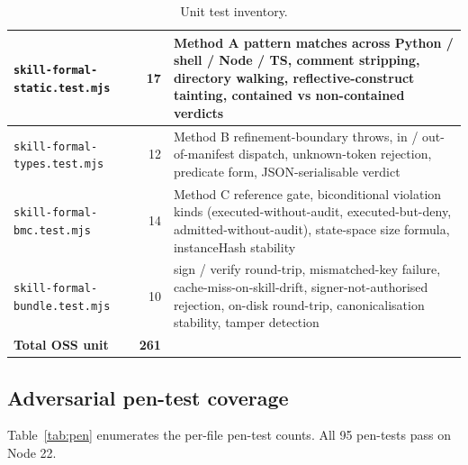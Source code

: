 \documentclass[11pt]{article}
\begin{document}
\begin{table}[t]
\begin{tabular}{|l|r|p{6cm}|}
    \hline
    \texttt{skill-formal-static.test.mjs} & 17 & Method A pattern matches across Python / shell / Node / TS, comment stripping, directory walking, reflective-construct tainting, contained vs non-contained verdicts \\
    \hline
    \texttt{skill-formal-types.test.mjs} & 12 & Method B refinement-boundary throws, in / out-of-manifest dispatch, unknown-token rejection, predicate form, JSON-serialisable verdict \\
    \hline
    \texttt{skill-formal-bmc.test.mjs} & 14 & Method C reference gate, biconditional violation kinds (executed-without-audit, executed-but-deny, admitted-without-audit), state-space size formula, instanceHash stability \\
    \hline
    \texttt{skill-formal-bundle.test.mjs} & 10 & sign / verify round-trip, mismatched-key failure, cache-miss-on-skill-drift, signer-not-authorised rejection, on-disk round-trip, canonicalisation stability, tamper detection \\
    \hline
    \textbf{Total OSS unit} & \textbf{261} & \\
    \hline
  \end{tabular}
  \caption{Unit test inventory.}
  \label{tab:unit}
\end{table}

\subsection{Adversarial pen-test coverage}

Table~\ref{tab:pen} enumerates the per-file pen-test counts. All 95
pen-tests pass on Node 22.
\end{document}
